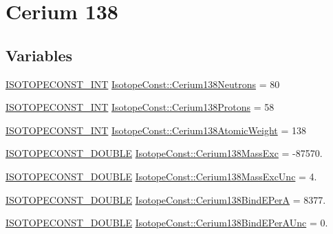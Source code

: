 \hypertarget{group___isotope_const-_cerium-_ce138}{}\section{Cerium 138}
\label{group___isotope_const-_cerium-_ce138}
\subsection*{Variables}
\begin{DoxyCompactItemize}
\item 
\mbox{\hyperlink{group___isotope_const-_macros_ga5f18360b3e99483a35c32d789e62621c}{I\+S\+O\+T\+O\+P\+E\+C\+O\+N\+S\+T\+\_\+\+I\+NT}} \mbox{\hyperlink{group___isotope_const-_cerium-_ce138_gaa05a3bcb5ff16308971641d94ded1a63}{Isotope\+Const\+::\+Cerium138\+Neutrons}} = 80
\item 
\mbox{\hyperlink{group___isotope_const-_macros_ga5f18360b3e99483a35c32d789e62621c}{I\+S\+O\+T\+O\+P\+E\+C\+O\+N\+S\+T\+\_\+\+I\+NT}} \mbox{\hyperlink{group___isotope_const-_cerium-_ce138_ga7e8c82dcea217201d462cc86296050b9}{Isotope\+Const\+::\+Cerium138\+Protons}} = 58
\item 
\mbox{\hyperlink{group___isotope_const-_macros_ga5f18360b3e99483a35c32d789e62621c}{I\+S\+O\+T\+O\+P\+E\+C\+O\+N\+S\+T\+\_\+\+I\+NT}} \mbox{\hyperlink{group___isotope_const-_cerium-_ce138_ga7b06dbe4b5faf3af5de7d0ea6f2a2b25}{Isotope\+Const\+::\+Cerium138\+Atomic\+Weight}} = 138
\item 
\mbox{\hyperlink{group___isotope_const-_macros_ga8f45a7272ce02c0b4c65c44636ed719a}{I\+S\+O\+T\+O\+P\+E\+C\+O\+N\+S\+T\+\_\+\+D\+O\+U\+B\+LE}} \mbox{\hyperlink{group___isotope_const-_cerium-_ce138_gabe66fd6299250ba29cdd0597ded063c3}{Isotope\+Const\+::\+Cerium138\+Mass\+Exc}} = -\/87570.
\item 
\mbox{\hyperlink{group___isotope_const-_macros_ga8f45a7272ce02c0b4c65c44636ed719a}{I\+S\+O\+T\+O\+P\+E\+C\+O\+N\+S\+T\+\_\+\+D\+O\+U\+B\+LE}} \mbox{\hyperlink{group___isotope_const-_cerium-_ce138_gaeefcd1ca5bdd3891baecbfe31e545790}{Isotope\+Const\+::\+Cerium138\+Mass\+Exc\+Unc}} = 4.
\item 
\mbox{\hyperlink{group___isotope_const-_macros_ga8f45a7272ce02c0b4c65c44636ed719a}{I\+S\+O\+T\+O\+P\+E\+C\+O\+N\+S\+T\+\_\+\+D\+O\+U\+B\+LE}} \mbox{\hyperlink{group___isotope_const-_cerium-_ce138_ga820756274181d896c3f8a595ee75d3f7}{Isotope\+Const\+::\+Cerium138\+Bind\+E\+PerA}} = 8377.
\item 
\mbox{\hyperlink{group___isotope_const-_macros_ga8f45a7272ce02c0b4c65c44636ed719a}{I\+S\+O\+T\+O\+P\+E\+C\+O\+N\+S\+T\+\_\+\+D\+O\+U\+B\+LE}} \mbox{\hyperlink{group___isotope_const-_cerium-_ce138_ga15c7f56ff23db9b19b98361b58c8c129}{Isotope\+Const\+::\+Cerium138\+Bind\+E\+Per\+A\+Unc}} = 0.

\end{DoxyCompactItemize}
